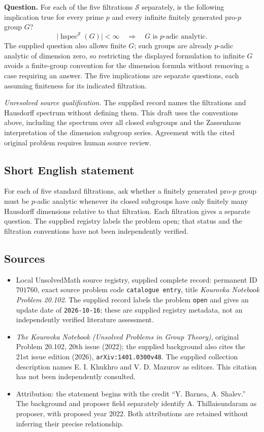 \documentclass[11pt]{article}
\begin{document}
\textbf{Question.} For each of the five filtrations \(\mathcal S\) separately, is the following implication true for every prime \(p\) and every infinite finitely generated pro-\(p\) group \(G\)?
\[
\bigl|\operatorname{hspec}^{\mathcal S}(G)\bigr|<\infty
\quad\Longrightarrow\quad
G\text{ is }p\text{-adic analytic}.
\]
The supplied question also allows finite \(G\); such groups are already \(p\)-adic analytic of dimension zero, so restricting the displayed formulation to infinite \(G\) avoids a finite-group convention for the dimension formula without removing a case requiring an answer. The five implications are separate questions, each assuming finiteness for its indicated filtration.

\textit{Unresolved source qualification.} The supplied record names the filtrations and Hausdorff spectrum without defining them. This draft uses the conventions above, including the spectrum over all closed subgroups and the Zassenhaus interpretation of the dimension subgroup series. Agreement with the cited original problem requires human source review.
\subsection{Short English statement}
For each of five standard filtrations, ask whether a finitely generated pro-\(p\) group must be \(p\)-adic analytic whenever its closed subgroups have only finitely many Hausdorff dimensions relative to that filtration. Each filtration gives a separate question. The supplied registry labels the problem open; that status and the filtration conventions have not been independently verified.
\subsection{Sources}
\begin{itemize}
\item Local UnsolvedMath source registry, supplied complete record: permanent ID \(701760\), exact source problem code \texttt{catalogue entry}, title \emph{Kourovka Notebook Problem 20.102}. The supplied record labels the problem \texttt{open} and gives an update date of \texttt{2026-10-16}; these are supplied registry metadata, not an independently verified literature assessment.
\item \emph{The Kourovka Notebook (Unsolved Problems in Group Theory)}, original Problem 20.102, 20th issue (2022); the supplied background also cites the 21st issue edition (2026), \texttt{arXiv:1401.0300v48}. The supplied collection description names E. I. Khukhro and V. D. Mazurov as editors. This citation has not been independently consulted.
\item Attribution: the statement begins with the credit ``Y. Barnea, A. Shalev.'' The background and proposer field separately identify A. Thillaisundaram as proposer, with proposed year 2022. Both attributions are retained without inferring their precise relationship.
\end{itemize}
\end{document}
